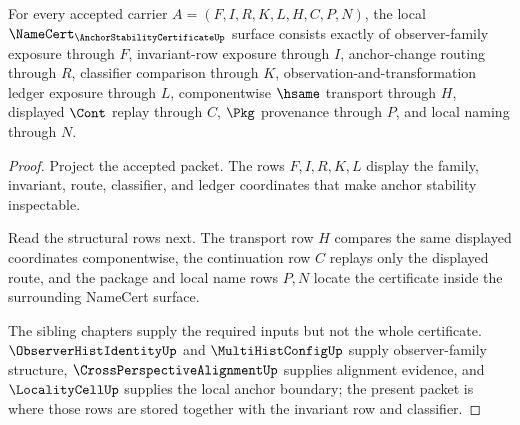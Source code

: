 \begin{theorem}
\label{thm:anchor-stability-certificate-namecert-obligations}
For every accepted \AnchorStabilityCertificateUp{} carrier $A=(F,I,R,K,L,H,C,P,N)$, the local $\NameCert_{\AnchorStabilityCertificateUp}$ surface consists exactly of observer-family exposure through $F$, invariant-row exposure through $I$, anchor-change routing through $R$, classifier comparison through $K$, observation-and-transformation ledger exposure through $L$, componentwise $\hsame$ transport through $H$, displayed $\Cont$ replay through $C$, $\Pkg$ provenance through $P$, and local naming through $N$.
\end{theorem}
\begin{proof}
Project the accepted packet. The rows $F,I,R,K,L$ display the family, invariant, route, classifier, and ledger coordinates that make anchor stability inspectable.

Read the structural rows next. The transport row $H$ compares the same displayed coordinates componentwise, the continuation row $C$ replays only the displayed route, and the package and local name rows $P,N$ locate the certificate inside the surrounding NameCert surface.

The sibling chapters supply the required inputs but not the whole certificate. $\ObserverHistIdentityUp$ and $\MultiHistConfigUp$ supply observer-family structure, $\CrossPerspectiveAlignmentUp$ supplies alignment evidence, and $\LocalityCellUp$ supplies the local anchor boundary; the present packet is where those rows are stored together with the invariant row and classifier.
\end{proof}

